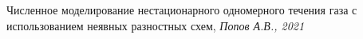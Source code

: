 \documentclass[specialist, subf, href, colorlinks=true, 14pt, times, mtpro, final]{disser}
\theoremstyle{definition}
\begin{document}
	
	
	\tableofcontents
	\newpage
	
	
	
	
	
	
	

	\newpage
	\begin{thebibliography}{100}
		 Численное моделирование нестационарного одномерного течения газа с использованием неявных разностных схем, \emph{Попов А.В., 2021}

	\end{thebibliography}
\end{document}

